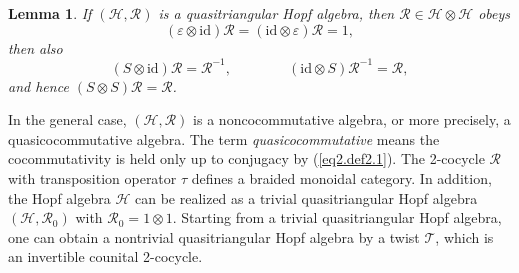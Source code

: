 \documentclass[reqno]{amsart}
\newtheorem{lemma}[formula]{Lemma}
\theoremstyle{definition}
\theoremstyle{remark}
\begin{document}
\begin{lemma}
    If $(\mathscr{H}, \mathcal{R})$ is a quasitriangular Hopf algebra, then $\mathcal{R} \in \mathscr{H}\otimes \mathscr{H}$ obeys
    \begin{equation}\label{eq1.lemma1}
        (\varepsilon\otimes \text{id})\mathcal{R}= (\text{id}\otimes \varepsilon)\mathcal{R}=1,
    \end{equation}
    then also 
    \begin{equation}
        (S\otimes \text{id})\mathcal{R}=\mathcal{R}^{-1}, \qquad \qquad (\text{id}\otimes S)\mathcal{R}^{-1}=\mathcal{R},
    \end{equation}
    and hence $(S\otimes S)\mathcal{R}=\mathcal{R}$.
\end{lemma}
In the general case, $(\mathscr{H},\mathcal{R})$ is a noncocommutative algebra, or more precisely, a quasicocommutative algebra. The term \textit{quasicocommutative} means the cocommutativity is held only up to conjugacy by (\ref{eq2.def2.1}). The 2-cocycle $\mathcal{R}$ with transposition operator $\tau$ defines a braided monoidal category. In addition, the Hopf algebra $\mathscr{H}$ can be realized as a trivial quasitriangular Hopf algebra $\left(\mathscr{H},\mathcal{R}_0\right)$ with $\mathcal{R}_0 = 1\otimes 1$. Starting from a trivial quasitriangular Hopf algebra, one can obtain a nontrivial quasitriangular Hopf algebra by a twist $\mathcal{T}$, which is an invertible counital 2-cocycle.
\end{document}
